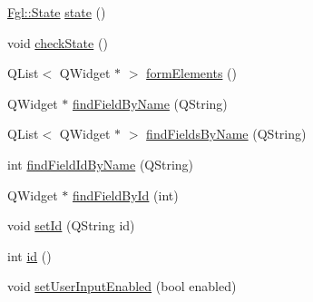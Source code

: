 \begin{DoxyCompactItemize}
\hyperlink{namespaceFgl_a66700792cb225549384ae76c1057cf22}{Fgl::State} \hyperlink{classFglForm_aeed42adf5a051006db1742e2b48617e1}{state} ()
\item 
void \hyperlink{classFglForm_a0ef6e6d0ddf327e89c3e2d54be8548a6}{checkState} ()
\item 
QList$<$ QWidget $\ast$ $>$ \hyperlink{classFglForm_ab40c533416d35aac75f2ccf5157a3cf2}{formElements} ()
\item 
QWidget $\ast$ \hyperlink{classFglForm_a7490b2d18830368110a69983f19d65cf}{findFieldByName} (QString)
\item 
QList$<$ QWidget $\ast$ $>$ \hyperlink{classFglForm_aa9bed6529e8937fdf1ebed65ca23cc45}{findFieldsByName} (QString)
\item 
int \hyperlink{classFglForm_a4d506d1f05b8ac540fe33dfa1524d681}{findFieldIdByName} (QString)
\item 
QWidget $\ast$ \hyperlink{classFglForm_a997cd55b341e14c89fdc300efe75b907}{findFieldById} (int)
\item 
void \hyperlink{classFglForm_a7010467be800cf868884b589f8ce8ce7}{setId} (QString id)
\item 
int \hyperlink{classFglForm_a4fc9bc745910f209c6f54f509293bd73}{id} ()
\item 
void \hyperlink{classFglForm_a47d0bbf071cbf0051b72c44a90062f81}{setUserInputEnabled} (bool enabled)
\end{DoxyCompactItemize}
